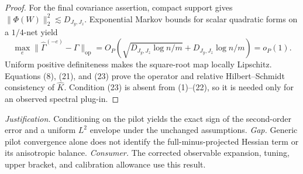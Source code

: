 \documentclass{article}
\begin{document}
\begin{proof}
For the final covariance assertion, compact support gives \(\|\Phi(W)\|_2^2\lesssim D_{J_y,J_z}\). Exponential Markov bounds for scalar quadratic forms on a \(1/4\)-net yield
\[
\max_e\|\widehat\Gamma^{(-e)}-\Gamma\|_{\mathrm{op}}
=O_P\!\left(\sqrt{D_{J_y,J_z}\log n/m}+D_{J_y,J_z}\log n/m\right)=o_P(1). \tag{23}
\]
Uniform positive definiteness makes the square-root map locally Lipschitz. Equations (8), (21), and (23) prove the operator and relative Hilbert--Schmidt consistency of \(\widehat K\). Condition (23) is absent from (1)--(22), so it is needed only for an observed spectral plug-in.
\end{proof}
\par\smallskip\noindent \textit{Justification.} Conditioning on the pilot yields the exact sign of the second-order error and a uniform \(L^2\) envelope under the unchanged assumptions. \textit{Gap.} Generic pilot convergence alone does not identify the full-minus-projected Hessian term or its anisotropic balance. \textit{Consumer.} The corrected observable expansion, tuning, upper bracket, and calibration allowance use this result.
\end{document}

